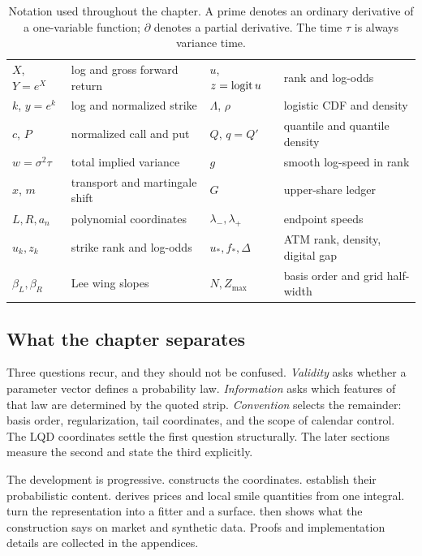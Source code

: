 \begin{table}[htbp]
\centering\small
\setlength{\tabcolsep}{4pt}
\begin{tabular}{@{}llll@{}}
\toprule
$X$, $Y=e^X$ & log and gross forward return &
$u$, $z=\operatorname{logit} u$ & rank and log-odds\\
$k$, $y=e^k$ & log and normalized strike &
$\Lambda$, $\rho$ & logistic CDF and density\\
$c$, $P$ & normalized call and put &
$Q$, $q=Q'$ & quantile and quantile density\\
$w=\sigma^2\tau$ & total implied variance &
$g$ & smooth log-speed in rank\\
$x$, $m$ & transport and martingale shift &
$G$ & upper-share ledger\\
$L,R,a_n$ & polynomial coordinates &
$\lambda_-,\lambda_+$ & endpoint speeds\\
$u_k,z_k$ & strike rank and log-odds &
$u_*,f_*,\Delta$ & ATM rank, density, digital gap\\
$\beta_L,\beta_R$ & Lee wing slopes &
$N,Z_{\max}$ & basis order and grid half-width\\
\bottomrule
\end{tabular}
\caption{Notation used throughout the chapter.  A prime denotes an ordinary
derivative of a one-variable function; $\partial$ denotes a partial
derivative.  The time $\tau$ is always variance time.}
\label{tab:notation}
\end{table}

\subsection{What the chapter separates}

Three questions recur, and they should not be confused.  \emph{Validity} asks
whether a parameter vector defines a probability law.  \emph{Information}
asks which features of that law are determined by the quoted strip.
\emph{Convention} selects the remainder: basis order, regularization, tail
coordinates, and the scope of calendar control.  The LQD coordinates settle
the first question structurally.  The later sections measure the second and
state the third explicitly.

The development is progressive.   constructs the coordinates.
 establish their probabilistic content.
 derives prices and local smile quantities from one integral.
 turn the representation into a fitter and a
surface.   then shows what the construction says on market
and synthetic data.  Proofs and implementation details are collected in the
appendices.
